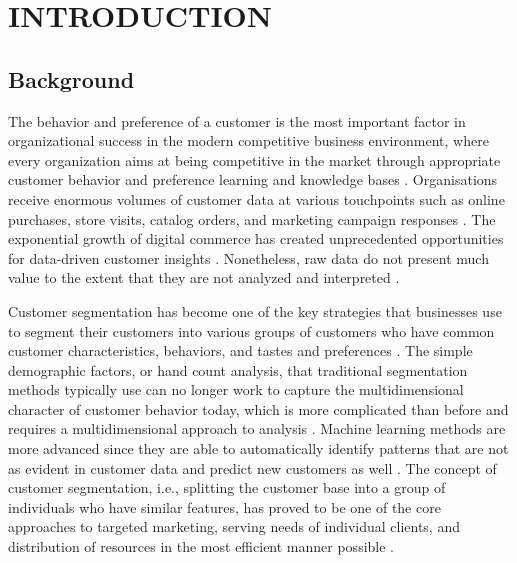 \documentclass[12pt,a4paper]{report}
\begin{document}
\listoftables
\newpage


\chapter{INTRODUCTION}

\section{Background}
The behavior and preference of a customer is the most important factor in organizational success in the modern competitive business environment, where every organization aims at being competitive in the market through appropriate customer behavior and preference learning and knowledge bases \cite{kotler2016}. Organisations receive enormous volumes of customer data at various touchpoints such as online purchases, store visits, catalog orders, and marketing campaign responses \cite{blattberg2008}. The exponential growth of digital commerce has created unprecedented opportunities for data-driven customer insights \cite{chen2012}. Nonetheless, raw data do not present much value to the extent that they are not analyzed and interpreted \cite{davenport2012}.

\noindent
Customer segmentation has become one of the key strategies that businesses use to segment their customers into various groups of customers who have common customer characteristics, behaviors, and tastes and preferences \cite{smith1956}. The simple demographic factors, or hand count analysis, that traditional segmentation methods typically use can no longer work to capture the multidimensional character of customer behavior today, which is more complicated than before and requires a multidimensional approach to analysis \cite{yankelovich1964}. Machine learning methods are more advanced since they are able to automatically identify patterns that are not as evident in customer data and predict new customers as well \cite{ngai2009}. The concept of customer segmentation, i.e., splitting the customer base into a group of individuals who have similar features, has proved to be one of the core approaches to targeted marketing, serving needs of individual clients, and distribution of resources in the most efficient manner possible \cite{kotler2016}.
\end{document}
